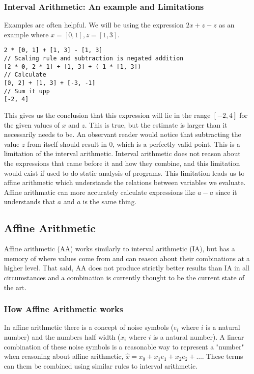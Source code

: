 \documentclass[msc,lith,english]{liuthesis}
\begin{document}
\subsubsection{Interval Arithmetic: An example and Limitations}
Examples are often helpful.
We will be using the expression $2x + z - z$ as an example where $x = [0, 1], z = [1, 3]$.

\begin{verbatim}
2 * [0, 1] + [1, 3] - [1, 3]
// Scaling rule and subtraction is negated addition 
[2 * 0, 2 * 1] + [1, 3] + (-1 * [1, 3])
// Calculate
[0, 2] + [1, 3] + [-3, -1]
// Sum it upp
[-2, 4]
\end{verbatim}

This gives us the conclusion that this expression will lie in the range $[-2, 4]$ for the given values of $x$ and $z$. This is true, but the estimate is larger than it necessarily needs to be. An observant reader would notice that subtracting the value $z$ from itself should result in $0$, which is a perfectly valid point. This is a limitation of the interval arithmetic. Interval arithmetic does not reason about the expressions that came before it and how they combine, and this limitation would exist if used to do static analysis of programs. This limitation leads us to affine arithmetic which understands the relations between variables we evaluate. Affine arithmatic can more accurately calculate expressions like $a - a$ since it understands that $a$ and $a$ is the same thing.


\subsection{Affine Arithmetic}
Affine arithmetic (AA) works similarly to interval arithmetic (IA), but has a memory of where values come from and can reason about their combinations at a higher level. That said, AA does not produce strictly better results than IA in all circumstances and a combination is currently thought to be the current state of the art. 

\subsubsection{How Affine Arithmetic works}
In affine arithmetic there is a concept of noise symbols ($e_i$ where $i$ is a natural number) and the numbers half width ($x_i$ where $i$ is a natural number). A linear combination of these noise symbols is a reasonable way to represent a "number" when reasoning about affine arithmetic, $\hat{x} = x_0 + x_1e_1 + x_2e_2 + \dots$. These terms can them be combined using similar rules to interval arithmetic.
\end{document}
